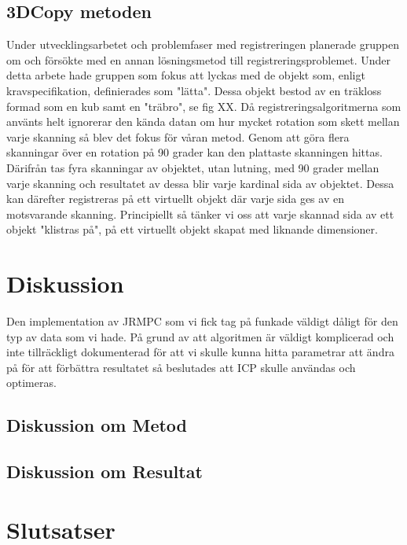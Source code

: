 \subsection{3DCopy metoden}
Under utvecklingsarbetet och problemfaser med registreringen planerade gruppen om och försökte med en annan lösningsmetod till registreringsproblemet. Under detta arbete hade gruppen som fokus att lyckas med de objekt som, enligt kravspecifikation, definierades som "lätta". Dessa objekt bestod av en träkloss formad som en kub samt en "träbro", se fig XX. Då registreringsalgoritmerna som använts helt ignorerar den kända datan om hur mycket rotation som skett mellan varje skanning så blev det fokus för våran metod. Genom att göra flera skanningar över en rotation på 90 grader kan den plattaste skanningen hittas. Därifrån tas fyra skanningar av objektet, utan lutning, med 90 grader mellan varje skanning och resultatet av dessa blir varje kardinal sida av objektet. Dessa kan därefter registreras på ett virtuellt objekt där varje sida ges av en motsvarande skanning. Principiellt så tänker vi oss att varje skannad sida av ett objekt "klistras på", på ett virtuellt objekt skapat med liknande dimensioner. 

\section{Diskussion}
\label{sec:discussion-karlsson}

Den implementation av JRMPC som vi fick tag på funkade väldigt dåligt för den typ av data som vi hade. På grund av att algoritmen är väldigt komplicerad och inte tillräckligt dokumenterad för att vi skulle kunna hitta parametrar att ändra på för att förbättra resultatet så beslutades att ICP skulle användas och optimeras.

\subsection{Diskussion om Metod}

\subsection{Diskussion om Resultat}



\section{Slutsatser}
\label{sec:conclusions-karlsson}


